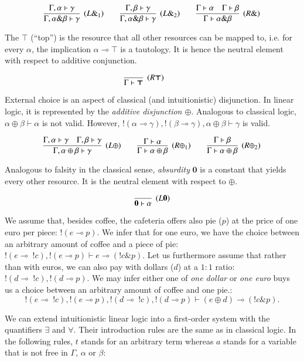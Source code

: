 \documentclass[acmtocl]{acmtrans2m}
\newcommand{\lp}{\multimap}
\newcommand{\bang}{\; !}
\newcommand{\lzero}{\boldsymbol{0}}
\newcommand{\ltop}{\boldsymbol{\top}}
\begin{document}
\[
\infer[(L\&_1)]{\Gamma,\alpha\&\beta\vdash\gamma}
    {\Gamma,\alpha\vdash\gamma}
\quad\quad
\infer[(L\&_2)]{\Gamma,\alpha\&\beta\vdash\gamma}
    {\Gamma,\beta\vdash\gamma}
\quad\quad
\infer[(R\&)]{\Gamma\vdash\alpha\&\beta}
    {\Gamma\vdash\alpha&\Gamma\vdash\beta}
\]

The $\ltop$ (``top'') is the resource that all other resources can be mapped to,
i.e. for every $\alpha$, the implication $\alpha\lp\ltop$ is a tautology. It is
hence the neutral element with respect to additive conjunction.

\[
\infer[(R\ltop)]{\Gamma \vdash \ltop}{}
\quad\quad
\]

External choice is an aspect of classical (and intuitionistic) disjunction. In
linear logic, it is represented by the \textit{additive disjunction $\oplus$}.
Analogous to classical logic, $\alpha\oplus\beta\vdash\alpha$ is not valid.
However, $!(\alpha\lp\gamma),!(\beta\lp\gamma), \alpha\oplus\beta\vdash\gamma$ is
valid.

\[
\infer[(L\oplus)]{\Gamma,\alpha\oplus\beta\vdash\gamma}
    {\Gamma,\alpha\vdash\gamma&\Gamma,\beta\vdash\gamma}
\quad\quad
\infer[(R\oplus_1)]{\Gamma\vdash\alpha\oplus\beta}
    {\Gamma\vdash\alpha}
\quad\quad
\infer[(R\oplus_2)]{\Gamma\vdash\alpha\oplus\beta}
    {\Gamma\vdash\beta}
\]

Analogous to falsity in the classical sense, \emph{absurdity} $\lzero$ is
a constant that yields every other resource. It is the neutral element with
respect to $\oplus$.

\[
\infer[(L\lzero)]{\lzero\vdash\alpha}{}
\]
\begin{example} We assume that, besides coffee, the cafeteria offers also pie
($p$) at the price of one euro per piece: $!(e\lp p)$. We infer that for one
euro, we have the choice between an arbitrary amount of coffee and a piece of
pie: $!(e\lp\bang c),!(e\lp p)\vdash e\lp( !c\& p)$. Let us furthermore assume that rather than
with euros, we can also pay with dollars ($d$) at a $1:1$ ratio: $!(d\lp\bang
c),!(d\lp p)$. We may infer either one of \emph{one dollar} or \emph{one euro}
buys us a choice between an arbitrary amount of coffee and one pie.:
\[!(e\lp\bang c),!(e\lp p),!(d\lp\bang c),!(d\lp p)\vdash (e\oplus d)\lp( !c\& p).\]
\end{example}

We can extend intuitionistic linear logic into a first-order system with the
quantifiers $\exists$ and $\forall$. Their introduction rules are the same as in
classical logic. In the following rules, $t$ stands for an arbitrary term whereas $a$ stands for a variable
that is not free in $\Gamma$, $\alpha$ or $\beta$:
\end{document}
